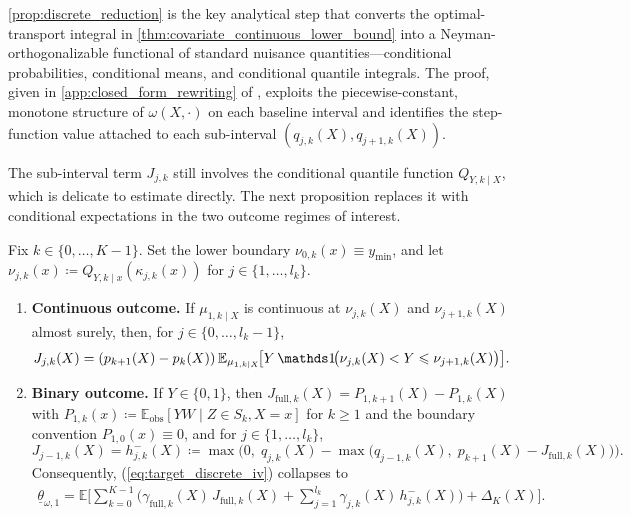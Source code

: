 \cref{prop:discrete_reduction} is the key analytical step that converts the optimal-transport integral in \cref{thm:covariate_continuous_lower_bound} into a Neyman-orthogonalizable functional of standard nuisance quantities---conditional probabilities, conditional means, and conditional quantile integrals. The proof, given in \cref{app:closed_form_rewriting} of \oalocation, exploits the piecewise-constant, monotone structure of $\omega(X,\cdot)$ on each baseline interval and identifies the step-function value attached to each sub-interval $(q_{j,k}(X), q_{j+1,k}(X))$.

The sub-interval term $J_{j,k}$ still involves the conditional quantile function $Q_{Y,k\mid X}$, which is delicate to estimate directly. The next proposition replaces it with conditional expectations in the two outcome regimes of interest.

\begin{proposition}\label{prop:J_specialization}
    Fix $k \in \{0,\dots,K-1\}$. Set the lower boundary $\nu_{0,k}(x)\equiv y_{\min}$, and let $\nu_{j,k}(x) \coloneqq Q_{Y,k\mid x}(\kappa_{j,k}(x))$ for $j \in \{1,\dots,l_k\}$.
    \begin{enumerate}[label=(\roman*)]
        \item \textbf{Continuous outcome.} If $\mu_{1,k\mid X}$ is continuous at $\nu_{j,k}(X)$ and $\nu_{j+1,k}(X)$ almost surely, then, for $j \in \{0,\dots,l_k-1\}$,
        \begin{equation}\label{eq:J_cexpectation}
            J_{j,k}(X) = (p_{k+1}(X) - p_k(X))\,\mathbb{E}_{\mu_{1,k\mid X}}\!\big[ Y\,\indicator\!\big(\nu_{j,k}(X) < Y \leqslant \nu_{j+1,k}(X)\big) \big].
        \end{equation}
        \item \textbf{Binary outcome.} If $Y \in \{0,1\}$, then $J_{\text{full},k}(X) = P_{1,k+1}(X) - P_{1,k}(X)$ with $P_{1,k}(x) \coloneqq \mathbb{E}_{\text{obs}}[YW \mid Z \in S_k, X=x]$ for $k\geqslant1$ and the boundary convention $P_{1,0}(x)\equiv0$, and for $j \in \{1,\dots,l_k\}$,
        \begin{equation}\label{eq:h_jk_binary}
            J_{j-1,k}(X) = h_{j,k}^{-}(X) \coloneqq \max\!\Big(0,\; q_{j,k}(X) - \max\!\big(q_{j-1,k}(X),\; p_{k+1}(X) - J_{\text{full},k}(X)\big)\Big).
        \end{equation}
        Consequently, (\ref{eq:target_discrete_iv}) collapses to
        \begin{align}\label{eq:binary_lower_bound}
            \underline{\theta}_{\omega,1} = \mathbb{E}\Bigg[\sum_{k=0}^{K-1}\bigg(\gamma_{\text{full},k}(X)\, J_{\text{full},k}(X) + \sum_{j=1}^{l_k} \gamma_{j,k}(X)\, h_{j,k}^{-}(X)\bigg) + \Delta_K(X)\Bigg].
        \end{align}
    \end{enumerate}
\end{proposition}

